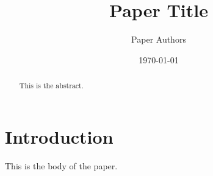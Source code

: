 \documentclass[a4paper]{article}
\title{Paper Title}
\author{Paper Authors}
\date{\today}
\theoremstyle{definition}
\theoremstyle{plain}
\begin{document}
\maketitle
\begin{abstract}
This is  the abstract.
\end{abstract}

\section{Introduction}
This is the body of the paper.

\end{document}
